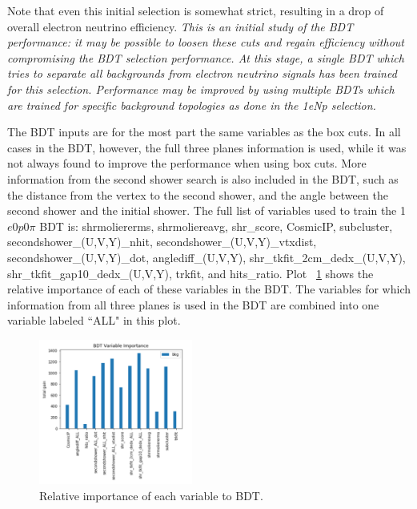 \documentclass[a4paper]{article}
\newcommand{\zpsel}{1$e$0$p$0$\pi$ }
\begin{document}
Note that even this initial selection is somewhat strict, resulting in a drop of overall electron neutrino efficiency.
\emph{This is an initial study of the BDT performance: it may be possible to loosen these cuts and regain efficiency without compromising the BDT selection performance. At this stage, a single BDT which tries to separate all backgrounds from electron neutrino signals has been trained for this selection.  Performance may be improved by using multiple BDTs which are trained for specific background topologies as done in the 1eNp selection. }

The BDT inputs are for the most part the same variables as the box cuts.  In all cases in the BDT, however, the full three planes information is used, while it was not always found to improve the performance when using box cuts.   More information from the second shower search is also included in the BDT, such as the distance from the vertex to the second shower, and the angle between the second shower and the initial shower. The full list of variables used to train the \zpsel BDT is: shrmoliererms, shrmoliereavg, shr\_score, CosmicIP, subcluster, secondshower\_(U,V,Y)\_nhit, secondshower\_(U,V,Y)\_vtxdist, secondshower\_(U,V,Y)\_dot, anglediff\_(U,V,Y), shr\_tkfit\_2cm\_dedx\_(U,V,Y), shr\_tkfit\_gap10\_dedx\_(U,V,Y), trkfit, and hits\_ratio. Plot ~\ref{fig:1e0p:bdtvars:RUN3} shows the relative importance of each of these variables in the BDT.  The variables for which information from all three planes is used in the BDT are combined into one variable labeled ``ALL" in this plot.  


\begin{figure}[H]
\begin{center}
\includegraphics[width=0.45\textwidth]{1e0p/bdt_vars_Run3.png}
\caption{\label{fig:1e0p:bdtvars:RUN3} Relative importance of each variable to BDT.}
\end{center}
\end{figure}
\end{document}
